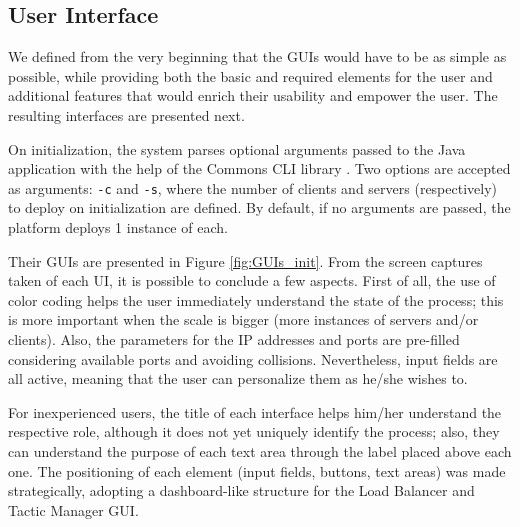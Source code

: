 \documentclass[12pt]{article}
\begin{document}
\newpage
\subsection{User Interface} \label{ui} %

We defined from the very beginning that the GUIs would have to be as simple as possible, while providing both the basic and required elements for the user and
additional features that would enrich their usability and empower the user.
The resulting interfaces are presented next.

On initialization, the system parses optional arguments passed to the Java application with the help of the Commons CLI library \cite{commonscli}.
Two options are accepted as arguments: \texttt{-c} and \texttt{-s}, where the number of clients and servers (respectively) to deploy on initialization are defined.
By default, if no arguments are passed, the platform deploys 1 instance of each.

Their GUIs are presented in Figure \ref{fig:GUIs_init}.
From the screen captures taken of each UI, it is possible to conclude a few aspects.
First of all, the use of color coding helps the user immediately understand the state of the process; this is more important when the scale is bigger (more
instances of servers and/or clients).
Also, the parameters for the IP addresses and ports are pre-filled considering available ports and avoiding collisions.
Nevertheless, input fields are all active, meaning that the user can personalize them as he/she wishes to.

For inexperienced users, the title of each interface helps him/her understand the respective role, although it does not yet uniquely identify the process;
also, they can understand the purpose of each text area through the label placed above each one.
The positioning of each element (input fields, buttons, text areas) was made strategically, adopting a dashboard-like structure for the Load Balancer and
Tactic Manager GUI.
\end{document}
